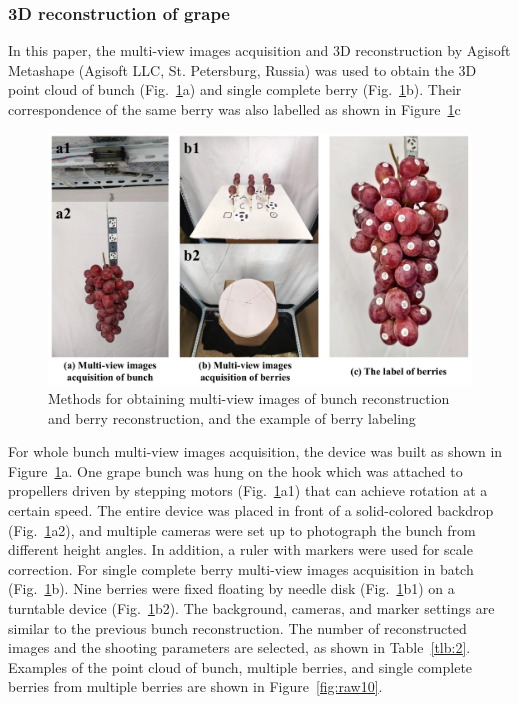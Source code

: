 \documentclass[12pt]{article}
\begin{document}
\subsubsection{3D reconstruction of grape}

In this paper, the multi-view images acquisition and 3D reconstruction by Agisoft Metashape (Agisoft LLC, St. Petersburg, Russia) was used to obtain the 3D point cloud of bunch (Fig.~\ref{fig:raw9}a) and single complete berry (Fig.~\ref{fig:raw9}b). 
Their correspondence of the same berry was also labelled as shown in Figure~\ref{fig:raw9}c

\begin{figure}[hbt!]
    \centering
    \includegraphics[width=1\textwidth]{figures/Figure3.pdf}
    \caption{Methods for obtaining multi-view images of bunch reconstruction and berry reconstruction, and the example of berry labeling}
    \label{fig:raw9}
\end{figure}

For whole bunch multi-view images acquisition, the device was built as shown in Figure~\ref{fig:raw9}a. 
One grape bunch was hung on the hook which was attached to propellers driven by stepping motors (Fig.~\ref{fig:raw9}a1) that can achieve rotation at a certain speed. 
The entire device was placed in front of a solid-colored backdrop (Fig.~\ref{fig:raw9}a2), and multiple cameras were set up to photograph the bunch from different height angles. 
In addition, a ruler with markers were used for scale correction. 
For single complete berry multi-view images acquisition in batch (Fig.~\ref{fig:raw9}b). 
Nine berries were fixed floating by needle disk (Fig.~\ref{fig:raw9}b1) on a turntable device (Fig.~\ref{fig:raw9}b2). 
The background, cameras, and marker settings are similar to the previous bunch reconstruction. 
The number of reconstructed images and the shooting parameters are selected, as shown in Table~\ref{tlb:2}. 
Examples of the point cloud of bunch, multiple berries, and single complete berries from multiple berries are shown in Figure~\ref{fig:raw10}.
\end{document}
